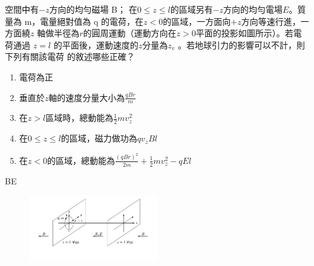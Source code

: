 \documentclass[cn,10pt,math=newtx,chinesefont=founder]{elegantbook}
\begin{document}
\begin{example}
    空間㆗有$-z$方向的均勻磁場 B； 在$0\leq z \leq l$的區域另有$-z$方向的均勻電場$E$。質量為
    m，電量絕對值為 q 的電荷，在$z<0$的區域，一方面向$+z$方向等速行進，一方面繞$z$
    軸做半徑為$r$的圓周運動（運動方向在$z>0$平面的投影如圖所示）。若電荷通過 $z=l$
    的平面後，運動速度的$z$分量為$z_v$ 。若地球引力的影響可以不計，則下列有關該電荷
    的敘述哪些正確？

\begin{enumerate}[label=(\Alph*)]
    \item 電荷為正
    \item 垂直於$z$軸的速度分量大小為$\frac{qBr}{m}$
    \item 在$z>l$區域時，總動能為$\frac{1}{2}mv_{z}^{2}$
    \item 在$0\leq z \leq l$的區域，磁力做功為$qv_z Bl$
    \item 在$z<0$的區域，總動能為$\frac{(qBr)^2}{2m}+\frac{1}{2}mv_{z}^{2}-qEl$
\end{enumerate}
\rightline{[92指考]}
\end{example}
\begin{solution}
    BE
\end{solution}
\begin{figure}[htbp]
    \flushright
    \includegraphics[width=0.5\textwidth]{image/92_20.png}
\end{figure}
\newpage
\end{document}
